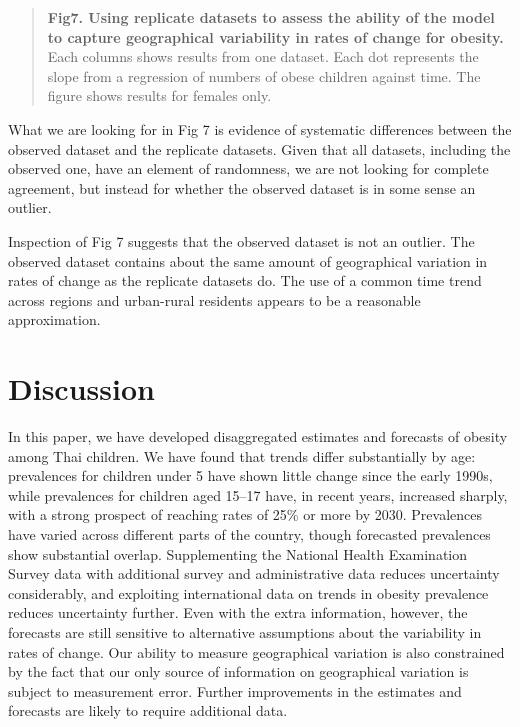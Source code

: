 \documentclass[10pt,letterpaper]{article}
\begin{document}
\begin{quote}
\textbf{Fig7. Using replicate datasets to assess the ability of the model to capture geographical variability in rates of change for obesity.} Each columns shows results from one dataset. Each dot represents the slope from a regression of numbers of obese children against time. The figure shows results for females only.
\end{quote}

What we are looking for in Fig 7 is evidence of systematic differences
between the observed dataset and the replicate datasets. Given that all
datasets, including the observed one, have an element of randomness, we
are not looking for complete agreement, but instead for whether the
observed dataset is in some sense an outlier.

Inspection of Fig 7 suggests that the observed dataset is not an
outlier. The observed dataset contains about the same amount of
geographical variation in rates of change as the replicate datasets do.
The use of a common time trend across regions and urban-rural residents
appears to be a reasonable approximation.

\hypertarget{discussion}{%
\section{Discussion}\label{discussion}}

In this paper, we have developed disaggregated estimates and forecasts
of obesity among Thai children. We have found that trends differ
substantially by age: prevalences for children under 5 have shown little
change since the early 1990s, while prevalences for children aged 15--17
have, in recent years, increased sharply, with a strong prospect of
reaching rates of 25\% or more by 2030. Prevalences have varied across
different parts of the country, though forecasted prevalences show
substantial overlap. Supplementing the National Health Examination
Survey data with additional survey and administrative data reduces
uncertainty considerably, and exploiting international data on trends in
obesity prevalence reduces uncertainty further. Even with the extra
information, however, the forecasts are still sensitive to alternative
assumptions about the variability in rates of change. Our ability to
measure geographical variation is also constrained by the fact that our
only source of information on geographical variation is subject to
measurement error. Further improvements in the estimates and forecasts
are likely to require additional data.
\end{document}

